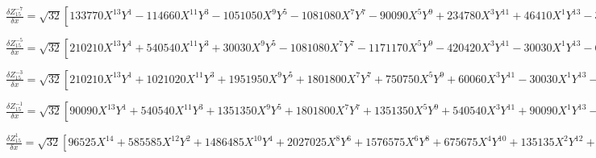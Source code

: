 \documentclass[10pt,landscape]{article}
\begin{document}
\vspace{1.2 mm}
\noindent $ \frac{\delta Z^{-7}_{15}}{\delta x} = \sqrt{32} [133770X^{13}Y^{1} -114660X^{11}Y^{3} -1051050X^{9}Y^{5} -1081080X^{7}Y^{7} -90090X^{5}Y^{9} +234780X^{3}Y^{11} +46410X^{1}Y^{13} -336336X^{11}Y^{1} +560560X^{9}Y^{3} +2018016X^{7}Y^{5} +864864X^{5}Y^{7} -400400X^{3}Y^{9} -144144X^{1}Y^{11} +300300X^{9}Y^{1} -720720X^{7}Y^{3} -1081080X^{5}Y^{5} +102960X^{3}Y^{7} +163020X^{1}Y^{9} -110880X^{7}Y^{1} +332640X^{5}Y^{3} +110880X^{3}Y^{5} -79200X^{1}Y^{7} +13860X^{5}Y^{1} -46200X^{3}Y^{3} +13860X^{1}Y^{5}] $

\vspace{1.2 mm}
\noindent $ \frac{\delta Z^{-5}_{15}}{\delta x} = \sqrt{32} [210210X^{13}Y^{1} +540540X^{11}Y^{3} +30030X^{9}Y^{5} -1081080X^{7}Y^{7} -1171170X^{5}Y^{9} -420420X^{3}Y^{11} -30030X^{1}Y^{13} -600600X^{11}Y^{1} -1001000X^{9}Y^{3} +720720X^{7}Y^{5} +2162160X^{5}Y^{7} +1161160X^{3}Y^{9} +120120X^{1}Y^{11} +643500X^{9}Y^{1} +514800X^{7}Y^{3} -1081080X^{5}Y^{5} -1132560X^{3}Y^{7} -180180X^{1}Y^{9} -316800X^{7}Y^{1} +443520X^{3}Y^{5} +126720X^{1}Y^{7} +69300X^{5}Y^{1} -46200X^{3}Y^{3} -41580X^{1}Y^{5} -5040X^{3}Y^{1} +5040X^{1}Y^{3}] $

\vspace{1.2 mm}
\noindent $ \frac{\delta Z^{-3}_{15}}{\delta x} = \sqrt{32} [210210X^{13}Y^{1} +1021020X^{11}Y^{3} +1951950X^{9}Y^{5} +1801800X^{7}Y^{7} +750750X^{5}Y^{9} +60060X^{3}Y^{11} -30030X^{1}Y^{13} -648648X^{11}Y^{1} -2522520X^{9}Y^{3} -3603600X^{7}Y^{5} -2162160X^{5}Y^{7} -360360X^{3}Y^{9} +72072X^{1}Y^{11} +772200X^{9}Y^{1} +2265120X^{7}Y^{3} +2162160X^{5}Y^{5} +617760X^{3}Y^{7} -51480X^{1}Y^{9} -443520X^{7}Y^{1} -887040X^{5}Y^{3} -443520X^{3}Y^{5} +124740X^{5}Y^{1} +138600X^{3}Y^{3} +13860X^{1}Y^{5} -15120X^{3}Y^{1} -5040X^{1}Y^{3} +504X^{1}Y^{1}] $

\vspace{1.2 mm}
\noindent $ \frac{\delta Z^{-1}_{15}}{\delta x} = \sqrt{32} [90090X^{13}Y^{1} +540540X^{11}Y^{3} +1351350X^{9}Y^{5} +1801800X^{7}Y^{7} +1351350X^{5}Y^{9} +540540X^{3}Y^{11} +90090X^{1}Y^{13} -288288X^{11}Y^{1} -1441440X^{9}Y^{3} -2882880X^{7}Y^{5} -2882880X^{5}Y^{7} -1441440X^{3}Y^{9} -288288X^{1}Y^{11} +360360X^{9}Y^{1} +1441440X^{7}Y^{3} +2162160X^{5}Y^{5} +1441440X^{3}Y^{7} +360360X^{1}Y^{9} -221760X^{7}Y^{1} -665280X^{5}Y^{3} -665280X^{3}Y^{5} -221760X^{1}Y^{7} +69300X^{5}Y^{1} +138600X^{3}Y^{3} +69300X^{1}Y^{5} -10080X^{3}Y^{1} -10080X^{1}Y^{3} +504X^{1}Y^{1}] $

\vspace{1.2 mm}
\noindent $ \frac{\delta Z^{1}_{15}}{\delta x} = \sqrt{32} [96525X^{14} +585585X^{12}Y^{2} +1486485X^{10}Y^{4} +2027025X^{8}Y^{6} +1576575X^{6}Y^{8} +675675X^{4}Y^{10} +135135X^{2}Y^{12} +6435Y^{14} -312312X^{12} -1585584X^{10}Y^{2} -3243240X^{8}Y^{4} -3363360X^{6}Y^{6} -1801800X^{4}Y^{8} -432432X^{2}Y^{10} -24024Y^{12} +396396X^{10} +1621620X^{8}Y^{2} +2522520X^{6}Y^{4} +1801800X^{4}Y^{6} +540540X^{2}Y^{8} +36036Y^{10} -249480X^{8} -776160X^{6}Y^{2} -831600X^{4}Y^{4} -332640X^{2}Y^{6} -27720Y^{8} +80850X^{6} +173250X^{4}Y^{2} +103950X^{2}Y^{4} +11550Y^{6} -12600X^{4} -15120X^{2}Y^{2} -2520Y^{4} +756X^{2} +252Y^{2} -8] $
\end{document}
